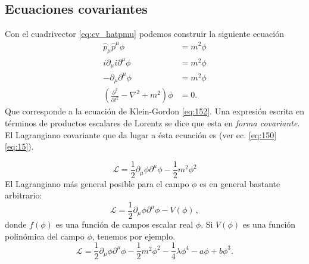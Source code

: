 \subsection{Ecuaciones covariantes}
\label{sec:ecuac-covar}


Con el cuadrivector \eqref{eq:cv_hatpmu} podemos construir la
siguiente ecuaci\'on
\begin{align}
  \hat{p}_\mu\hat{p}^\mu\phi&=m^2\phi\nonumber\\
  i\partial_\mu i\partial^\mu\phi&=m^2\phi\nonumber\\
  -\partial_\mu\partial^\mu\phi&=m^2\phi\nonumber\\
  \label{eq:waveec}
  \left(\frac{\partial^2}{\partial t^2}-\nabla^2+m^2\right)\phi&=0.
\end{align}
Que corresponde a la ecuaci\'on de Klein-Gordon \eqref{eq:152}. Una expresi\'on escrita en t\'erminos de productos escalares de Lorentz se dice que esta en \emph{forma covariante}. El Lagrangiano covariante que da lugar a
\'esta ecuaci\'on es (ver ec. \eqref{eq:150}
\eqref{eq:15}). %

\begin{equation}
  \label{eq:wavelagtrue}
  \mathcal{L}=\frac{1}{2}\partial_\mu\phi\partial^\mu\phi-\frac{1}{2}m^2\phi^2
\end{equation}
El Lagrangiano m\'as general posible para el campo $\phi$ es en general bastante arbitrario:
\begin{equation}
  \mathcal{L}=\frac{1}{2}\partial_\mu\phi\partial^\mu\phi-V(\phi)\,,
\end{equation}
donde $f(\phi)$ es una función de campos escalar real $\phi$. Si $V(\phi)$ es una función polinómica del campo $\phi$, tenemos por ejemplo.
\begin{equation}
  \label{eq:wavelag}
  \mathcal{L}=\frac{1}{2}\partial_\mu\phi\partial^\mu\phi-\frac{1}{2}m^2\phi^2-\frac{1}{4}\lambda\phi^4-a\phi+b\phi^3.
\end{equation}

